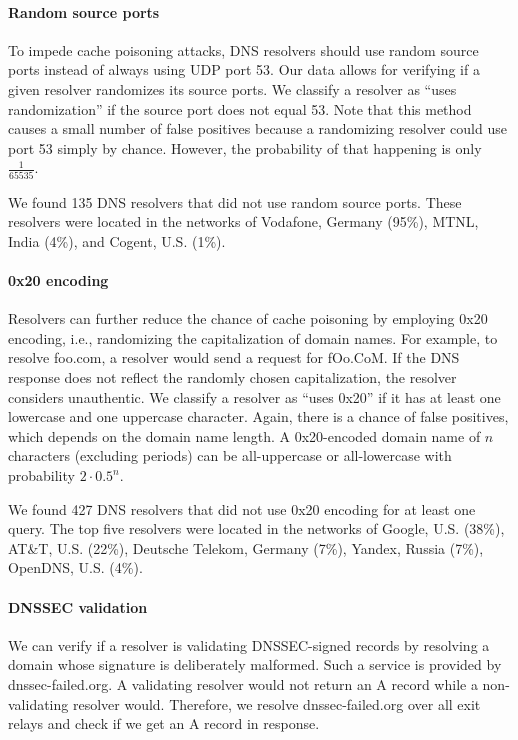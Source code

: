 \paragraph{Random source ports}
To impede cache poisoning attacks, DNS resolvers should use random source ports
instead of always using UDP port 53.  Our data allows for verifying if a given
resolver randomizes its source ports.  We classify a resolver as ``uses
randomization'' if the source port does not equal 53.  Note that this method
causes a small number of false positives because a randomizing resolver could
use port 53 simply by chance.  However, the probability of that happening is
only $\frac{1}{65535}$.

We found 135 DNS resolvers that did not use random source ports.  These
resolvers were located in the networks of Vodafone, Germany (95\%), MTNL, India
(4\%), and Cogent, U.S. (1\%).

\paragraph{0x20 encoding}
Resolvers can further reduce the chance of cache poisoning by employing 0x20
encoding, i.e., randomizing the capitalization of domain names.  For example,
to resolve foo.com, a resolver would send a request for fOo.CoM.  If the DNS
response does not reflect the randomly chosen capitalization, the resolver
considers unauthentic.  We classify a resolver as ``uses 0x20'' if it has at
least one lowercase and one uppercase character.  Again, there is a chance of
false positives, which depends on the domain name length.  A 0x20-encoded
domain name of $n$ characters (excluding periods) can be all-uppercase or
all-lowercase with probability $2 \cdot 0.5^n$.

We found 427 DNS resolvers that did not use 0x20 encoding for at least one
query.  The top five resolvers were located in the networks of Google, U.S.
(38\%), AT\&T, U.S. (22\%), Deutsche Telekom, Germany (7\%), Yandex, Russia
(7\%), OpenDNS, U.S. (4\%).

\paragraph{DNSSEC validation}
We can verify if a resolver is validating DNSSEC-signed records by resolving a
domain whose signature is deliberately malformed.  Such a service is provided
by dnssec-failed.org.  A validating resolver would not return an A record while
a non-validating resolver would.  Therefore, we resolve dnssec-failed.org over
all exit relays and check if we get an A record in response.
\fi
